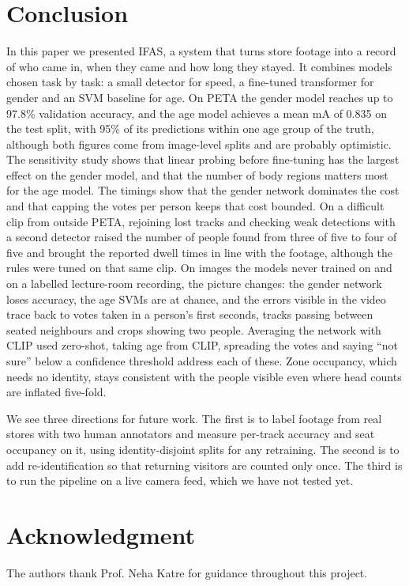 \documentclass[conference]{IEEEtran}
\newcommand{\mA}{\mathrm{mA}}
\begin{document}
\section{Conclusion}
\label{sec:conclusion}

In this paper we presented IFAS, a system that turns store footage into a record of
who came in, when they came and how long they stayed. It combines models chosen
task by task: a small detector for speed, a fine-tuned transformer for gender and
an SVM baseline for age. On PETA the gender model reaches up to 97.8\% validation
accuracy, and the age model achieves a mean $\mA$ of 0.835 on the test split, with
95\% of its predictions within one age group of the truth, although both figures
come from image-level splits and are probably optimistic. The sensitivity study
shows that linear probing before fine-tuning has the largest effect on the gender
model, and that the number of body regions matters most for the age model. The
timings show that the gender network dominates the cost and that capping the votes
per person keeps that cost bounded. On a difficult clip from outside PETA,
rejoining lost tracks and checking weak detections with a second detector raised
the number of people found from three of five to four of five and brought the
reported dwell times in line with the footage, although the rules were tuned on
that same clip. On images the models never trained on and on a labelled
lecture-room recording, the picture changes: the gender network loses accuracy,
the age SVMs are at chance, and the errors visible in the video trace back to
votes taken in a person's first seconds, tracks passing between seated
neighbours and crops showing two people. Averaging the network with CLIP used
zero-shot, taking age from CLIP, spreading the votes and saying ``not sure''
below a confidence threshold address each of these. Zone occupancy, which needs
no identity, stays consistent with the people visible even where head counts are
inflated five-fold.

We see three directions for future work. The first is to label footage from real
stores with two human annotators and measure per-track accuracy and seat
occupancy on it, using identity-disjoint splits for any retraining. The second is to add re-identification so that returning visitors
are counted only once. The third is to run the pipeline on a live camera feed,
which we have not tested yet.

\section*{Acknowledgment}
The authors thank Prof. Neha Katre for guidance throughout this project.



\end{document}
